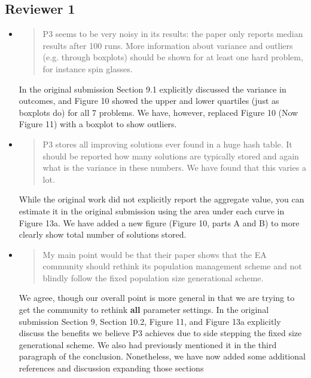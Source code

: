 \documentclass[]{article}
\begin{document}
\subsection{Reviewer 1}
\begin{itemize}

\item
\begin{quote}
P3 seems to be very noisy in its results: the paper only reports median results after 100 runs. More information about variance and outliers (e.g. through boxplots) should be shown for at least one hard problem, for instance spin glasses. 
\end{quote}

In the original submission Section 9.1 explicitly discussed the variance in outcomes,
and Figure 10 showed the upper and lower quartiles (just as boxplots do) for all 7 problems.
We have, however, replaced Figure 10 (Now Figure 11) with a boxplot to show outliers.

\item
\begin{quote}
P3 stores all improving solutions ever found in a huge hash table. It should be reported how many solutions are typically stored and again what is the variance in these numbers. We have found that this varies a lot. 
\end{quote}

While the original work did not explicitly report the aggregate value,
you can estimate it in the original submission using the area under each curve in Figure 13a.
We have added a new figure (Figure 10, parts A and B) to more clearly show total number of solutions stored.

\item
\begin{quote}
My main point would be that their paper shows that the EA community should rethink its population management scheme and not blindly follow the fixed population size generational scheme.
\end{quote}

We agree, though our overall point is more general in that we are trying to get the community to rethink \textbf{all} parameter settings. In the original submission Section 9, Section 10.2,  Figure 11, and Figure 13a explicitly discuss the benefits we believe P3 achieves due to side stepping the fixed size generational scheme. We also had previously mentioned it in the third paragraph of the conclusion. Nonetheless, we have now added some additional references and discussion expanding those sections


\end{itemize}
\end{document}
